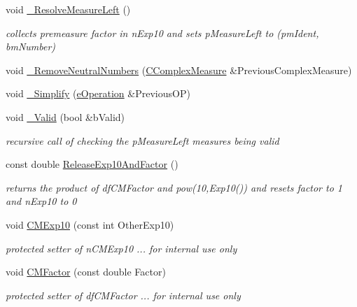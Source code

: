 \begin{DoxyCompactItemize}
$$void \hyperlink{classCComplexMeasure_a8f642a3a0044d4dc0492774bca8666e9}{\+\_\+\+Resolve\+Measure\+Left} ()
\begin{DoxyCompactList}\small\item\em collects premeasure factor in n\+Exp10 and sets p\+Measure\+Left to (pm\+Ident, bm\+Number) \end{DoxyCompactList}\item 
void \hyperlink{classCComplexMeasure_a9eb89170847ab2ef592eace6453cf300}{\+\_\+\+Remove\+Neutral\+Numbers} (\hyperlink{classCComplexMeasure}{C\+Complex\+Measure} \&Previous\+Complex\+Measure)
\item 
void \hyperlink{classCComplexMeasure_ae66b48f40cc04866424ca5b7114d4adb}{\+\_\+\+Simplify} (\hyperlink{MeasureOperator_8h_a1431c79e3ad4b4c5bcc9f31f188538f2}{e\+Operation} \&Previous\+OP)
\item 
void \hyperlink{classCComplexMeasure_ae3605c75d2c571b06108b4b19af6618b}{\+\_\+\+Valid} (bool \&b\+Valid)
\begin{DoxyCompactList}\small\item\em recursive call of checking the p\+Measure\+Left measures being valid \end{DoxyCompactList}\item 
const double \hyperlink{classCComplexMeasure_a2c4086ab6b664259b820f554f647cdbd}{Release\+Exp10\+And\+Factor} ()
\begin{DoxyCompactList}\small\item\em returns the product of df\+C\+M\+Factor and pow(10,\+Exp10()) and resets factor to 1 and n\+Exp10 to 0 \end{DoxyCompactList}\item 
void \hyperlink{classCComplexMeasure_aaa6f3cf75ee0dd2a880adaaf43e81168}{C\+M\+Exp10} (const int Other\+Exp10)
\begin{DoxyCompactList}\small\item\em protected setter of n\+C\+M\+Exp10 ... for internal use only \end{DoxyCompactList}\item 
void \hyperlink{classCComplexMeasure_abc97b2ed29224bb00a912a94933192a2}{C\+M\+Factor} (const double Factor)
\begin{DoxyCompactList}\small\item\em protected setter of df\+C\+M\+Factor ... for internal use only \end{DoxyCompactList}\end{DoxyCompactItemize}
